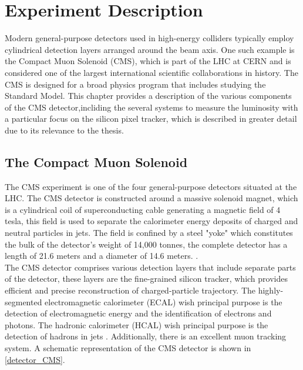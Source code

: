\chapter{Experiment Description}
Modern general-purpose detectors used in high-energy colliders typically employ cylindrical detection layers arranged around the beam axis. One such example is the Compact Muon Solenoid (CMS), which is part of the LHC at CERN and is considered one of the largest international scientific collaborations in history. The CMS is designed for a broad physics program that includes studying the Standard Model. This chapter provides a description of the various components of the CMS detector,incliding the several systems to measure the luminosity with a particular focus on the silicon pixel tracker, which is described in greater detail due to its relevance to the thesis.
 
\section{The Compact Muon Solenoid}

The CMS experiment is one of the four general-purpose detectors situated at the LHC. The CMS detector is constructed around a massive solenoid magnet, which is a cylindrical coil of superconducting cable generating a magnetic field of 4 tesla, this field is used to separate the calorimeter energy deposits of charged and neutral particles in jets. The field is confined by a steel "yoke" which constitutes the bulk of the detector's weight of 14,000 tonnes, the complete detector has a length of 21.6 meters and a diameter of 14.6 meters.  \cite{CMS_Exp_2008}. \\

The CMS detector comprises various detection layers that include separate parts of the detector, these layers are the fine-grained silicon tracker, which provides efficient and precise reconstruction of charged-particle trajectory. The highly-segmented electromagnetic calorimeter (ECAL) wish principal purpose is the detection of  electromagnetic energy and the identification of electrons and photons. The hadronic calorimeter (HCAL) wish principal purpose is the detection of hadrons in jets  \cite{CMS_Exp_2008}. Additionally, there is an excellent muon tracking system. A schematic representation of the CMS detector is shown in \ref{detector_CMS}.

